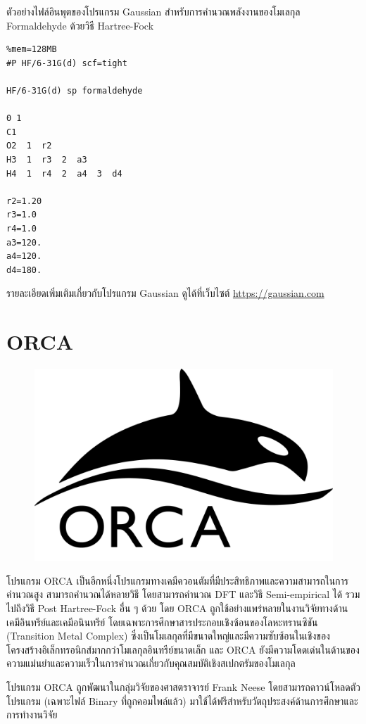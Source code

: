 ตัวอย่างไฟล์อินพุตของโปรแกรม Gaussian สำหรับการคำนวณพลังงานของโมเลกุล Formaldehyde ด้วยวิธี Hartree-Fock

\begin{lstlisting}[style=plain]
%chk=formaldehyde.chk
%mem=128MB
#P HF/6-31G(d) scf=tight

HF/6-31G(d) sp formaldehyde

0 1
C1
O2  1  r2
H3  1  r3  2  a3
H4  1  r4  2  a4  3  d4

r2=1.20
r3=1.0
r4=1.0
a3=120.
a4=120.
d4=180.
\end{lstlisting}

\vspace{1em}

รายละเอียดเพิ่มเติมเกี่ยวกับโปรแกรม Gaussian ดูได้ที่เว็บไซต์ \url{https://gaussian.com}

\section{ORCA}
\label{sec:software_orca}

\begin{figure}[H]
    \centering
    \includegraphics[width=0.4\linewidth]{fig/logo_orca.png}
    \label{fig:logo_orca}
\end{figure}

โปรแกรม ORCA เป็นอีกหนึ่งโปรแกรมทางเคมีควอนตัมที่มีประสิทธิภาพและความสามารถในการคำนวณสูง\autocite{neese2012,neese2018} 
สามารถคำนวณได้หลายวิธี โดยสามารถคำนวณ DFT และวิธี Semi-empirical ได้ รวมไปถึงวิธี Post Hartree-Fock อื่น ๆ ด้วย โดย ORCA 
ถูกใช้อย่างแพร่หลายในงานวิจัยทางด้านเคมีอินทรีย์และเคมีอนินทรีย์ โดยเฉพาะการศึกษาสารประกอบเชิงซ้อนของโลหะทรานซิชัน (Transition 
Metal Complex) ซึ่งเป็นโมเลกุลที่มีขนาดใหญ่และมีความซับซ้อนในเชิงของโครงสร้างอิเล็กทรอนิกส์มากกว่าโมเลกุลอินทรีย์ขนาดเล็ก และ ORCA 
ยังมีความโดดเด่นในด้านของความแม่นยำและความเร็วในการคำนวณเกี่ยวกับคุณสมบัติเชิงสเปกตรัมของโมเลกุล

โปรแกรม ORCA ถูกพัฒนาในกลุ่มวิจัยของศาสตราจารย์ Frank Neese โดยสามารถดาวน์โหลดตัวโปรแกรม (เฉพาะไฟล์ Binary ที่ถูกคอมไพล์แล้ว)
มาใช้ได้ฟรีสำหรับวัตถุประสงค์ด้านการศึกษาและการทำงานวิจัย 

